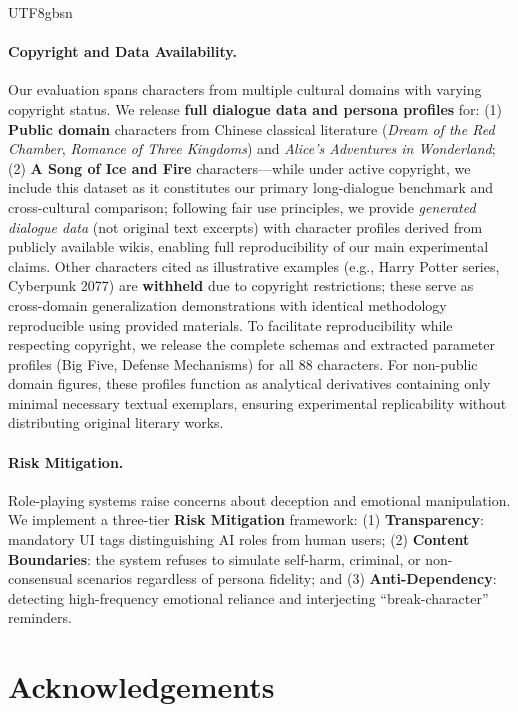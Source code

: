 \documentclass[11pt]{article}
\begin{document}
\begin{CJK*}{UTF8}{gbsn}
\paragraph{Copyright and Data Availability.}
Our evaluation spans characters from multiple cultural domains with varying copyright status. We release \textbf{full dialogue data and persona profiles} for:
(1) \textbf{Public domain} characters from Chinese classical literature (\textit{Dream of the Red Chamber}, \textit{Romance of Three Kingdoms}) and \textit{Alice's Adventures in Wonderland};
(2) \textbf{A Song of Ice and Fire} characters---while under active copyright, we include this dataset as it constitutes our primary long-dialogue benchmark and cross-cultural comparison; following fair use principles, we provide \textit{generated dialogue data} (not original text excerpts) with character profiles derived from publicly available wikis, enabling full reproducibility of our main experimental claims.
Other characters cited as illustrative examples (e.g., Harry Potter series, Cyberpunk 2077) are \textbf{withheld} due to copyright restrictions; these serve as cross-domain generalization demonstrations with identical methodology reproducible using provided materials.
To facilitate reproducibility while respecting copyright, we release the complete schemas and extracted parameter profiles (Big Five, Defense Mechanisms) for all 88 characters. For non-public domain figures, these profiles function as analytical derivatives containing only minimal necessary textual exemplars, ensuring experimental replicability without distributing original literary works.

\paragraph{Risk Mitigation.} Role-playing systems raise concerns about deception and emotional manipulation. We implement a three-tier \textbf{Risk Mitigation} framework: (1) \textbf{Transparency}: mandatory UI tags distinguishing AI roles from human users; (2) \textbf{Content Boundaries}: the system refuses to simulate self-harm, criminal, or non-consensual scenarios regardless of persona fidelity; and (3) \textbf{Anti-Dependency}: detecting high-frequency emotional reliance and interjecting ``break-character'' reminders.



\section*{Acknowledgements}


\end{CJK*}
\end{document}
